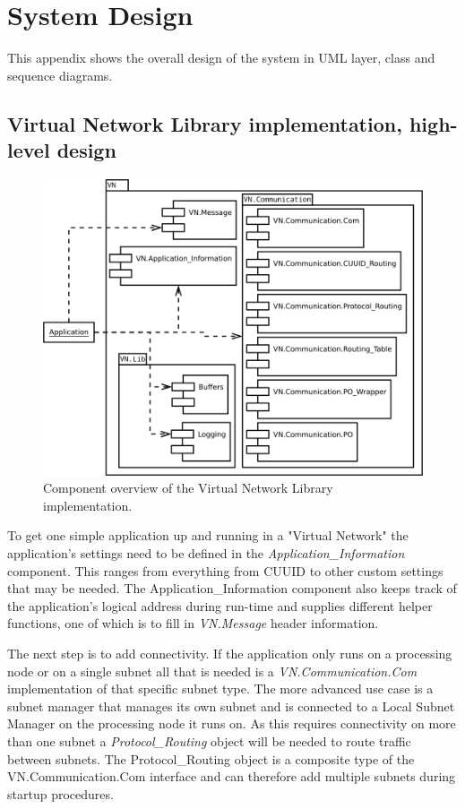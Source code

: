 \chapter{System Design}\label{ch:appendix_design}
This appendix shows the overall design of the system in UML layer, class and
sequence diagrams.

\section{Virtual Network Library implementation, high-level
design}\label{sec:layered_design}

\begin{figure}[h]
    \centering
    \includegraphics[width=\textwidth]{figures/appendix_component_overview}
    \caption{Component overview of the Virtual Network Library implementation.}
    \label{fig:appendix_component_overview}
\end{figure}

To get one simple application up and running in a "Virtual Network" the
application's settings need to be defined in the \emph{Application\_Information}
component. This ranges from everything from CUUID to other custom settings that
may be needed. The Application\_Information component also keeps track of the
application's logical address during run-time and supplies different helper
functions, one of which is to fill in \emph{VN.Message} header information.

The next step is to add connectivity. If the application only runs on a
processing node or on a single subnet all that is needed is a
\newline \emph{VN.Communication.Com} implementation of that specific subnet type. The
more advanced use case is a subnet manager that manages its own subnet and is
connected to a Local Subnet Manager on the processing node it runs on. As this
requires connectivity on more than one subnet a \emph{Protocol\_Routing} object
will be needed to route traffic between subnets. The Protocol\_Routing object
is a composite type of the VN.Communication.Com interface and can
therefore add multiple subnets during startup procedures.

